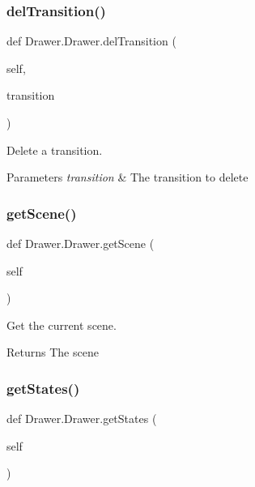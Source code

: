 \subsubsection{\texorpdfstring{delTransition()}{delTransition()}}
{\footnotesize\ttfamily def Drawer.\+Drawer.\+del\+Transition (\begin{DoxyParamCaption}\item[{}]{self,  }\item[{}]{transition }\end{DoxyParamCaption})}



Delete a transition. 


\begin{DoxyParams}{Parameters}
{\em transition} & The transition to delete \\
\hline
\end{DoxyParams}
\mbox{\label{classDrawer_1_1Drawer_a6d0baf0bf280f0cbfc42e7fc8d57cadb}} 
\subsubsection{\texorpdfstring{getScene()}{getScene()}}
{\footnotesize\ttfamily def Drawer.\+Drawer.\+get\+Scene (\begin{DoxyParamCaption}\item[{}]{self }\end{DoxyParamCaption})}



Get the current scene. 

\begin{DoxyReturn}{Returns}
The scene 
\end{DoxyReturn}
\mbox{\label{classDrawer_1_1Drawer_a80e742a1ca3ac0eb44f8f0ce5168a135}} 
\subsubsection{\texorpdfstring{getStates()}{getStates()}}
{\footnotesize\ttfamily def Drawer.\+Drawer.\+get\+States (\begin{DoxyParamCaption}\item[{}]{self }\end{DoxyParamCaption})}



